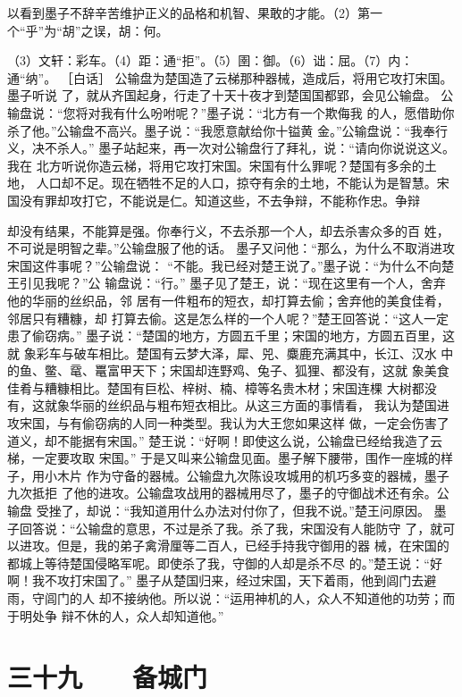 \documentclass[12pt,UTF8]{ctexbook}
\begin{document}
以看到墨子不辞辛苦维护正义的品格和机智、果敢的才能。（2）第一个“乎”为“胡”之误，胡：何。 

（3）文轩：彩车。（4）距：通“拒”。（5）圉：御。（6）诎：屈。（7）内：通“纳”。 
［白话］ 
公输盘为楚国造了云梯那种器械，造成后，将用它攻打宋国。墨子听说 
了，就从齐国起身，行走了十天十夜才到楚国国都郢，会见公输盘。 
公输盘说：“您将对我有什么吩咐呢？”墨子说：“北方有一个欺侮我 
的人，愿借助你杀了他。”公输盘不高兴。墨子说：“我愿意献给你十镒黄 
金。”公输盘说：“我奉行义，决不杀人。” 
墨子站起来，再一次对公输盘行了拜礼，说：“请向你说说这义。我在 
北方听说你造云梯，将用它攻打宋国。宋国有什么罪呢？楚国有多余的土地， 
人口却不足。现在牺牲不足的人口，掠夺有余的土地，不能认为是智慧。宋 
国没有罪却攻打它，不能说是仁。知道这些，不去争辩，不能称作忠。争辩 

却没有结果，不能算是强。你奉行义，不去杀那一个人，却去杀害众多的百 
姓，不可说是明智之辈。”公输盘服了他的话。 
墨子又问他：“那么，为什么不取消进攻宋国这件事呢？”公输盘说： 
“不能。我已经对楚王说了。”墨子说：“为什么不向楚王引见我呢？”公 
输盘说：“行。” 
墨子见了楚王，说：“现在这里有一个人，舍弃他的华丽的丝织品，邻 
居有一件粗布的短衣，却打算去偷；舍弃他的美食佳肴，邻居只有糟糠，却 
打算去偷。这是怎么样的一个人呢？”楚王回答说：“这人一定患了偷窃病。” 
墨子说：“楚国的地方，方圆五千里；宋国的地方，方圆五百里，这就 
象彩车与破车相比。楚国有云梦大泽，犀、兕、麋鹿充满其中，长江、汉水 
中的鱼、鳖、鼋、鼍富甲天下；宋国却连野鸡、兔子、狐狸、都没有，这就 
象美食佳肴与糟糠相比。楚国有巨松、梓树、楠、樟等名贵木材；宋国连棵 
大树都没有，这就象华丽的丝织品与粗布短衣相比。从这三方面的事情看， 
我认为楚国进攻宋国，与有偷窃病的人同一种类型。我认为大王您如果这样 
做，一定会伤害了道义，却不能据有宋国。” 
楚王说：“好啊！即使这么说，公输盘已经给我造了云梯，一定要攻取 
宋国。” 
于是又叫来公输盘见面。墨子解下腰带，围作一座城的样子，用小木片 
作为守备的器械。公输盘九次陈设攻城用的机巧多变的器械，墨子九次抵拒 
了他的进攻。公输盘攻战用的器械用尽了，墨子的守御战术还有余。公输盘 
受挫了，却说：“我知道用什么办法对付你了，但我不说。”楚王问原因。 
墨子回答说：“公输盘的意思，不过是杀了我。杀了我，宋国没有人能防守 
了，就可以进攻。但是，我的弟子禽滑厘等二百人，已经手持我守御用的器 
械，在宋国的都城上等待楚国侵略军呢。即使杀了我，守御的人却是杀不尽 
的。”楚王说：“好啊！我不攻打宋国了。” 
墨子从楚国归来，经过宋国，天下着雨，他到闾门去避雨，守闾门的人 
却不接纳他。所以说：“运用神机的人，众人不知道他的功劳；而于明处争 
辩不休的人，众人却知道他。” 

\chapter{三十九　　备城门}
\end{document}
